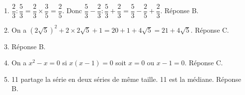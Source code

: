
\medskip 

%
%
%
%
\begin{enumerate}
\item $\dfrac{2}{3} : \dfrac{5}{3} = \dfrac{2}{3} \times \dfrac{3}{5} = \dfrac{2}{5}$. Donc  $\dfrac{5}{3} -  \dfrac{2}{3} : \dfrac{5}{3} + \dfrac{2}{3} = \dfrac{5}{3} - \dfrac{2}{5} + \dfrac{2}{3}$. Réponse B.
\item On a $\left(2\sqrt{5} \right)^2 + 2 \times 2\sqrt{5} + 1 = 20 + 1 + 4\sqrt{5} = 21 + 4\sqrt{5}$. Réponse C.
\item Réponse B.
\item On a $x^2 - x = 0$ si $x(x - 1) = 0$ soit $x = 0$ ou $x - 1 = 0$. Réponse C.
\item 11 partage la série en deux séries de même taille. 11 est la médiane. Réponse B.
\end{enumerate}

\bigskip

